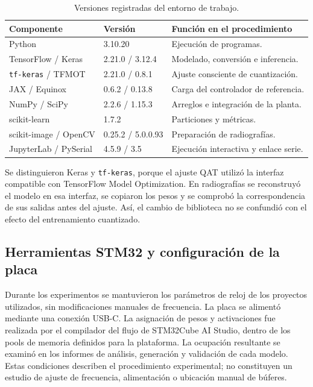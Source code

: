 \begin{table}[htbp]
\centering
\caption{Versiones registradas del entorno de trabajo.}
\label{tab:entorno_cap5}
\begingroup\small{}
\begin{tabularx}{\textwidth}{@{}p{3.8cm}p{3.0cm}Y@{}}
\toprule
Componente & Versión & Función en el procedimiento \\
\midrule
Python & 3.10.20 & Ejecución de programas. \\
TensorFlow / Keras & 2.21.0 / 3.12.4 & Modelado, conversión e inferencia. \\
\texttt{tf-keras} / TFMOT & 2.21.0 / 0.8.1 & Ajuste consciente de cuantización. \\
JAX / Equinox & 0.6.2 / 0.13.8 & Carga del controlador de referencia. \\
NumPy / SciPy & 2.2.6 / 1.15.3 & Arreglos e integración de la planta. \\
scikit-learn & 1.7.2 & Particiones y métricas. \\
scikit-image / OpenCV & 0.25.2 / 5.0.0.93 & Preparación de radiografías. \\
JupyterLab / PySerial & 4.5.9 / 3.5 & Ejecución interactiva y enlace serie. \\
\bottomrule
\end{tabularx}
\endgroup
\end{table}

Se distinguieron Keras y \texttt{tf-keras}, porque el ajuste QAT utilizó la interfaz compatible con TensorFlow Model Optimization. En radiografías se reconstruyó el modelo en esa interfaz, se copiaron los pesos y se comprobó la correspondencia de sus salidas antes del ajuste. Así, el cambio de biblioteca no se confundió con el efecto del entrenamiento cuantizado.

\subsection{Herramientas STM32 y configuración de la placa}

Durante los experimentos se mantuvieron los parámetros de reloj de los proyectos utilizados, sin modificaciones manuales de frecuencia. La placa se alimentó mediante una conexión USB-C. La asignación de pesos y activaciones fue realizada por el compilador del flujo de STM32Cube AI Studio, dentro de los pools de memoria definidos para la plataforma. La ocupación resultante se examinó en los informes de análisis, generación y validación de cada modelo. Estas condiciones describen el procedimiento experimental; no constituyen un estudio de ajuste de frecuencia, alimentación o ubicación manual de búferes.

